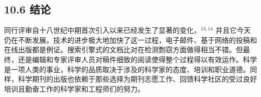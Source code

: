 \subsection*{10.6 结论}
同行评审自十八世纪中期首次引入以来已经发生了显著的变化，${ }^{13,14}$ 并且它今天仍在不断发展。技术的进步极大地加快了这一过程，电子邮件、基于网络的投稿和在线出版都是例证。搜索引擎式的文档比对在检测剽窃方面做得相当不错。但最终，还是编辑和专家评审人员对稿件细致的阅读使得整个过程得以有效运作。科学是一项人类的事业，科学的品质取决于涉及的科学家的态度、培训和职业道德。同样，科学期刊的出版也依赖于那些选择为期刊志愿工作、回馈科学社区的受过良好培训且勤奋工作的科学家和工程师们的努力。

